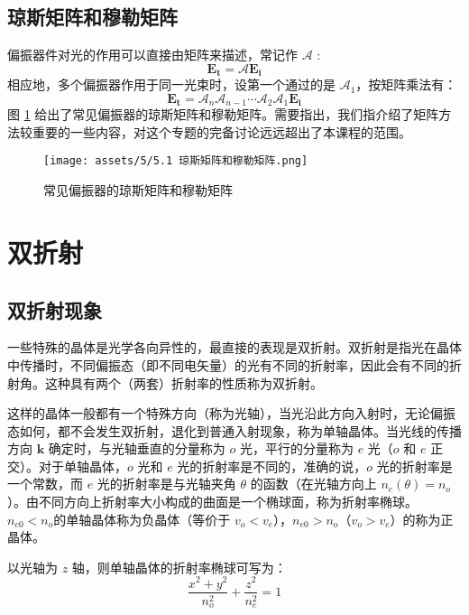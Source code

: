 \documentclass[UTF8]{report}
\theoremstyle{MyLineTheoremStyle} %
\theoremstyle{MyBlockTheoremStyle} %
\theoremstyle{MySubsubsectionStyle} %
\begin{document}
\subsection{琼斯矩阵和穆勒矩阵}
偏振器件对光的作用可以直接由矩阵来描述，常记作 $\mathscr{A}$ : 
\begin{equation}
\boldsymbol{E_t} = \mathscr{A} \boldsymbol{E_i}
\end{equation}
相应地，多个偏振器作用于同一光束时，设第一个通过的是 $\mathscr{A_1}$，按矩阵乘法有：
\begin{equation}
    \boldsymbol{E_t} = \mathscr{A}_n\mathscr{A}_{n-1}\cdots\mathscr{A}_{2}\mathscr{A}_{1} \boldsymbol{E_i}
\end{equation}
图 \ref{琼斯矩阵} 给出了常见偏振器的琼斯矩阵和穆勒矩阵。需要指出，我们指介绍了矩阵方法较重要的一些内容，对这个专题的完备讨论远远超出了本课程的范围。
\begin{figure}[H]\centering
    \texttt{[image: assets/5/5.1 琼斯矩阵和穆勒矩阵.png]}
    \caption{常见偏振器的琼斯矩阵和穆勒矩阵}
    \label{琼斯矩阵}
\end{figure}

\section{双折射}

\subsection{双折射现象}
一些特殊的晶体是光学各向异性的，最直接的表现是双折射。双折射是指光在晶体中传播时，不同偏振态（即不同电矢量）的光有不同的折射率，因此会有不同的折射角。这种具有两个（两套）折射率的性质称为双折射。

这样的晶体一般都有一个特殊方向（称为光轴），当光沿此方向入射时，无论偏振态如何，都不会发生双折射，退化到普通入射现象，称为单轴晶体。当光线的传播方向 $\boldsymbol{k}$ 确定时，与光轴垂直的分量称为 $o$ 光，平行的分量称为 $e$ 光（$o$ 和 $e$ 正交）。对于单轴晶体，$o$ 光和 $e$ 光的折射率是不同的，准确的说，$o$ 光的折射率是一个常数，而 $e$ 光的折射率是与光轴夹角 $\theta$ 的函数（在光轴方向上 $n_e(\theta) = n_o$）。由不同方向上折射率大小构成的曲面是一个椭球面，称为折射率椭球。$n_{e0} < n_o$的单轴晶体称为负晶体（等价于 $v_o < v_e$），$n_{e0} > n_o$（$v_o > v_e$）的称为正晶体。

以光轴为 $z$ 轴，则单轴晶体的折射率椭球可写为：
\begin{equation}
\frac{x^2 + y^2}{n_o^2} + \frac{z^2}{n_e^2} = 1
\end{equation}
\end{document}
